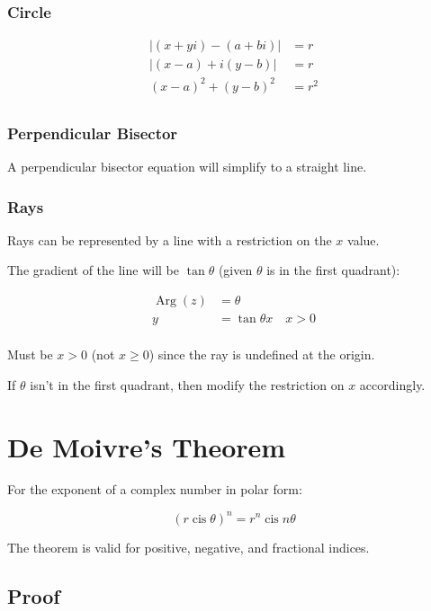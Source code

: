 \documentclass[a4paper,11pt]{article}
\DeclareMathOperator\cis{cis}
\DeclareMathOperator\Arg{Arg}
\begin{document}
\subsubsection{Circle}

$$
\begin{aligned}
\lvert (x + yi) - (a + bi) \rvert & = r \\
\lvert (x - a) + i(y - b) \rvert & = r \\
(x - a)^2 + (y - b)^2 & = r^2 \\
\end{aligned}
$$


\subsubsection{Perpendicular Bisector}

A perpendicular bisector equation will simplify to a straight line.


\subsubsection{Rays}

Rays can be represented by a line with a restriction on the $x$ value.

The gradient of the line will be $\tan{\theta}$ (given $\theta$ is in the first
quadrant):

$$
\begin{aligned}
\Arg(z) & = \theta \\
y & = \tan{\theta} x \quad x > 0 \\
\end{aligned}
$$

Must be $x > 0$ (not $x \geq 0$) since the ray is undefined at the origin.

If $\theta$ isn't in the first quadrant, then modify the restriction on $x$
accordingly.




\section{De Moivre's Theorem}

For the exponent of a complex number in polar form:

$$
(r \cis{\theta})^n = r^n \cis{n \theta}
$$

The theorem is valid for positive, negative, and fractional indices.


\subsection{Proof}
\end{document}
